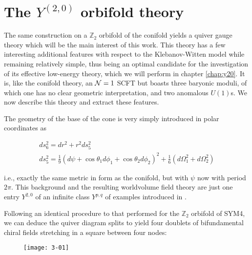 \section{The $Y^{(2,0)}$ orbifold theory}\label{sec:squares}

The same construction on a $\mathbb{Z}_2$ orbifold of the conifold yields a quiver gauge theory which will be the main interest of this work. This theory has a few interesting additional features with respect to the Klebanov-Witten model while remaining relatively simple, thus being an optimal candidate for the investigation of its effective low-energy theory, which we will perform in chapter \ref{chap:y20}. It is, like the conifold theory, an $\mathcal{N} = 1$ SCFT but boasts three baryonic moduli, of which one has no clear geometric interpretation, and two anomalous $U(1)$s. We now describe this theory and extract these features.

The geometry of the base of the cone is very simply introduced in polar coordinates as 

\begin{gather}
	ds^2_6 = dr^2 + r^2 ds_5^2\nonumber\\
	ds^2_5 = \frac{1}{9} (d\psi + \cos\theta_1 d\phi_1 + \cos\theta_2 d\phi_2)^2 + \frac{1}{6} (d\Omega_1^2 + d\Omega_2^2)\label{y20conemetric}
\end{gather}

i.e., exactly the same metric in form as the conifold, but with $\psi$ now with period $2\pi$. This background and the resulting worldvolume field theory are just one entry $Y^{2,0}$ of an infinite class $Y^{p,q}$ of examples introduced in \cite{benvenutiInfinite}.

Following an identical procedure to that performed for the $\mathbb{Z}_2$ orbifold of SYM4, we can deduce the quiver diagram splits to yield four doublets of bifundamental chiral fields stretching in a square between four nodes:

\begin{figure}[H]
	\centering
\texttt{[image: 3-01]}
\end{figure}

